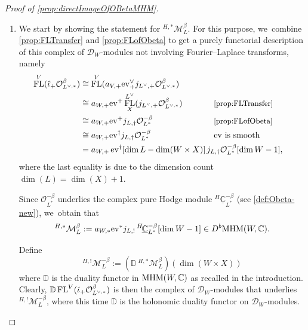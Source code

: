 \documentclass[JEP,XML,SOM,Unicode,published]{cedram}
\let\mathds\mathbb
\newcommand{\ev}{\mathrm{ev}}
\newcommand{\dC}{{\mathds C}}\let\C\dC
\newcommand{\bD}{{\mathbb D}}\let\mbd\bD
\newcommand{\cD}{\mathscr{D}}
\newcommand{\cM}{\mathcal{M}}
\newcommand{\cO}{\mathcal{O}}\let\O\cO
\DeclareMathOperator{\FL}{\textup{FL}}
\newcommand{\MHM}{\textup{MHM}}
\newcommand{\Mh}{{^{H,*}}\cM_L^\beta}
\newcommand{\MhD}{{^{H,!}}\cM_L^{-\beta}}
\begin{document}
\skpt
\begin{proof}[Proof of \cref{prop:directImageOfOBetaMHM}]
\begin{enumerate}
\item
We start by showing the statement for ${^{H,*}}\cM_L^\beta$. For this purpose, we~combine \cref{prop:FLTransfer} and \cref{prop:FLofObeta} to get a purely functorial description of this complex of $\mathscr{D}_W$\nobreakdash-mod\-ules not involving Fourier--Laplace transforms, namely
\begin{equation}\label{eq:ProofOf38}
\begin{aligned}
\FL^V(\hat\iota_+ \O_{L^{\vee,*}}^{\beta}) 
&\cong \FL^V(a_{V,+}\ev^\vee_+ j_{{L^{\vee}},+} \O_{L^{\vee,*}}^\beta) \\
&\cong a_{W,+} \ev^+ \FL_X^{L^\vee}(j_{{L^\vee},+} \O_{L^{\vee,*}}^\beta) && {\textup{\small\cref{prop:FLTransfer}}} \\
&\cong a_{W,+} \ev^+ j_{L,\dag} \O_{L^{*}}^{-\beta} &&{\textup{\small\cref{prop:FLofObeta}}}\\
&\cong a_{W,+} \ev^\dag j_{L,\dag} \O_{L^{*}}^{-\beta} &&{\ev \textup{ is smooth}}\\
&= a_{W,+} \, \ev^\dag[\dim L - \dim (W\times X)] &&\hspace*{-3mm} j_{L,\dag} \O_{L^{*}}^{-\beta}[\dim W-1],
\end{aligned}
\end{equation}
where the last equality is due to the dimension count $\dim(L)=\dim(X)+1$.

Since $\O_{L^*}^{-\beta}$ underlies the complex pure Hodge module $^{H\!}\underline{\dC}^{-\beta}_{L^*}$ (see \cref{def:Obeta-new}), we~obtain that
\begin{equation}\label{eq:defMbeta}
\Mh := a_{W,*} \ev^* j_{L,!}\, ^{H\!}\underline{\dC}^{-\beta}_{L^*}[\dim W-1]
\in D^b\MHM(W,\dC).
\end{equation}

Define
\[
\MhD:=(\bD\, \Mh)(\dim(W \times X))
\]
where $\bD$ is the duality functor in $\MHM(W,\dC)$ as recalled in the introduction. Clearly, $\bD \FL^V(\hat{\iota}_+\cO^\beta_{L^{\vee,*}})$ is then the complex of $\cD_W$\nobreakdash-mod\-ules that underlies $\MhD$, where this time $\bD$ is the holonomic duality functor on $\cD_W$\nobreakdash-mod\-ules.


\end{enumerate}
\end{proof}
\end{document}
